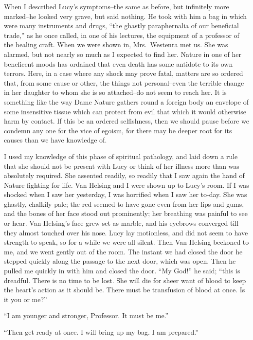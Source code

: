 \documentclass[12pt,openright]{book}
\begin{document}
When I described Lucy’s symptoms–the same as before, but infinitely more marked–he looked very grave, but said nothing. He took with him a bag in which were many instruments and drugs, “the ghastly paraphernalia of our beneficial trade,” as he once called, in one of his lectures, the equipment of a professor of the healing craft. When we were shown in, Mrs. Westenra met us. She was alarmed, but not nearly so much as I expected to find her. Nature in one of her beneficent moods has ordained that even death has some antidote to its own terrors. Here, in a case where any shock may prove fatal, matters are so ordered that, from some cause or other, the things not personal–even the terrible change in her daughter to whom she is so attached–do not seem to reach her. It is something like the way Dame Nature gathers round a foreign body an envelope of some insensitive tissue which can protect from evil that which it would otherwise harm by contact. If this be an ordered selfishness, then we should pause before we condemn any one for the vice of egoism, for there may be deeper root for its causes than we have knowledge of.

I used my knowledge of this phase of spiritual pathology, and laid down a rule that she should not be present with Lucy or think of her illness more than was absolutely required. She assented readily, so readily that I saw again the hand of Nature fighting for life. Van Helsing and I were shown up to Lucy’s room. If I was shocked when I saw her yesterday, I was horrified when I saw her to-day. She was ghastly, chalkily pale; the red seemed to have gone even from her lips and gums, and the bones of her face stood out prominently; her breathing was painful to see or hear. Van Helsing’s face grew set as marble, and his eyebrows converged till they almost touched over his nose. Lucy lay motionless, and did not seem to have strength to speak, so for a while we were all silent. Then Van Helsing beckoned to me, and we went gently out of the room. The instant we had closed the door he stepped quickly along the passage to the next door, which was open. Then he pulled me quickly in with him and closed the door. “My God!” he said; “this is dreadful. There is no time to be lost. She will die for sheer want of blood to keep the heart’s action as it should be. There must be transfusion of blood at once. Is it you or me?”

“I am younger and stronger, Professor. It must be me.”

“Then get ready at once. I will bring up my bag. I am prepared.”
\end{document}
